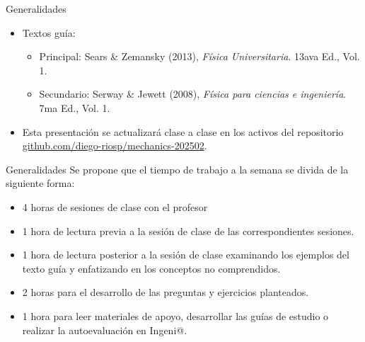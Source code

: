 \begin{frame}{Generalidades}
    \begin{itemize}
        \item Textos guía:
        \begin{itemize}
            \item Principal: Sears \& Zemansky (2013), \textit{Física Universitaria}. 13ava Ed., Vol. 1.
            \item Secundario: Serway \& Jewett (2008), \textit{Física para ciencias e ingeniería}. 7ma Ed., Vol. 1.
        \end{itemize}
        \item Esta presentación se actualizará clase a clase en los activos del repositorio {\color{blue}\url{github.com/diego-riosp/mechanics-202502}}.
    \end{itemize}
\end{frame}

\begin{frame}{Generalidades}
    Se propone que el tiempo de trabajo a la semana se divida de la siguiente forma:
\begin{itemize}
    \item 4 horas de sesiones de clase con el profesor
    \item 1 hora de lectura previa a la sesión de clase de las correspondientes sesiones.
    \item 1 hora de lectura posterior a la sesión de clase examinando los ejemplos del texto guía y enfatizando en los conceptos no comprendidos.
    \item 2 horas para el desarrollo de las preguntas y ejercicios planteados.
    \item 1 hora para leer materiales de apoyo, desarrollar las guías de estudio o realizar la autoevaluación en Ingeni@.
\end{itemize}
\end{frame}

